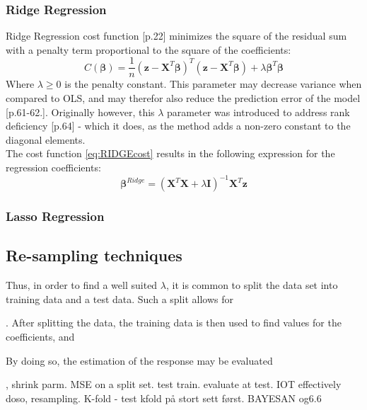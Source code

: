 \documentclass[%
oneside,                 %
final,                   %
10pt]{article}
\begin{document}
\subsubsection{Ridge Regression}
Ridge Regression cost function \citep{MehtaPankaj2019Ahli}[p.22] minimizes the square of the residual sum with a penalty term proportional to the square of the coefficients:
\begin{equation}
C(\bm{\beta})=\frac{1}{n}(\bm{z}-\bm{X}^T\bm{\beta})^T(\bm{z}-\bm{X}^T\bm{\beta})+\lambda \bm{\beta}^T\bm{\beta}
\label{eq:RIDGEcost}
\end{equation}
Where $ \lambda \geq 0$ is the penalty constant. This parameter may decrease variance when compared to OLS, and may therefor also reduce the prediction error of the model \citep{HastieTrevor2009TEoS}[p.61-62.]. Originally however, this $\lambda$ parameter was introduced to address rank deficiency \citep{HastieTrevor2009TEoS}[p.64] - which it does, as the method adds a non-zero constant to the diagonal elements. \\
The cost function \eqref{eq:RIDGEcost} results in the following expression for the regression coefficients:
\begin{equation}
\bm{\beta}^{Ridge}=(\bm{X}^T\bm{X}+\lambda\bm{I})^{-1}\bm{X}^T\bm{z}
\end{equation}

\subsubsection{Lasso Regression}
\subsection{Re-sampling techniques}
Thus, in order to find a well suited $\lambda$, it is common to split the data set into training data and a test data. Such a split allows for 


. After splitting the data, the training data is then used to find values for the coefficients, and 

By doing so, the estimation of the response may be evaluated 

, shrink parm. MSE on a split set. test train. evaluate at test. IOT effectively doso, resampling. K-fold - test kfold på stort sett først.
BAYESAN og6.6
\end{document}
